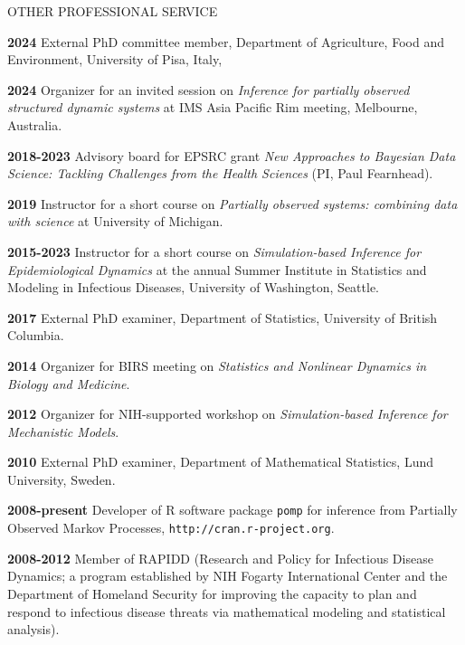 \begin{mylist}{OTHER PROFESSIONAL SERVICE}

\item{\bf 2024 } External PhD committee member, Department of Agriculture, Food and Environment, University of Pisa, Italy,
  
\item{\bf 2024 } Organizer for an invited session on {\it Inference for partially observed structured dynamic systems} at IMS Asia Pacific Rim meeting, Melbourne, Australia.
   
\item{\bf 2018-2023 } Advisory board for EPSRC grant {\it New Approaches to Bayesian Data Science: Tackling Challenges from the Health Sciences}  (PI, Paul Fearnhead).

\item{\bf 2019 } Instructor for a short course on {\it Partially observed systems: combining data with science} at University of Michigan.

\item{\bf 2015-2023 } Instructor for a short course on {\it Simulation-based Inference for Epidemiological Dynamics} at the annual Summer Institute in Statistics and Modeling in Infectious Diseases, University of Washington, Seattle.

\item{\bf 2017 } External PhD examiner, Department of Statistics, University of British Columbia.

\item{\bf 2014 } Organizer for BIRS meeting on {\it Statistics and Nonlinear Dynamics in Biology and Medicine}.

\item{\bf 2012 } Organizer for NIH-supported workshop on {\it Simulation-based Inference for Mechanistic Models}.

\item{\bf 2010 } External PhD examiner, 
Department of Mathematical Statistics, Lund University, Sweden.

\item{\bf 2008-present } Developer of R software package {\texttt{pomp}} for inference from Partially Observed Markov Processes, {\texttt{http://cran.r-project.org}}.

\item{\bf 2008-2012 } Member of RAPIDD (Research and Policy for Infectious Disease Dynamics; a program established by NIH Fogarty International Center and the Department of Homeland Security for improving the capacity to plan and respond to infectious disease threats via mathematical modeling and statistical analysis).


\end{mylist}
